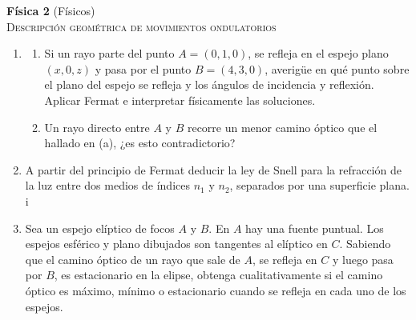\documentclass[11pt,spanish,a4paper]{article}
\begin{document}
\begin{center}
  \textbf{Física 2} (Físicos) \hfill {}\\
  \textsc{\LARGE Descripción geométrica de movimientos ondulatorios}
\par\end{center}{\large \par}



\begin{enumerate}

\section*{Fermat, Snell}


\item 
\begin{enumerate}
	\item Si un rayo parte del punto $A=(0,1,0)$, se refleja en el espejo plano
$(x,0,z)$ y pasa por el punto $B=(4,3,0)$, averigüe en qué punto
sobre el plano del espejo se refleja y los ángulos de incidencia y
reflexión. Aplicar Fermat e interpretar físicamente las soluciones. 
	\item Un rayo directo entre $A$ y $B$ recorre un menor camino óptico que
el hallado en (a), ¿es esto contradictorio?
\end{enumerate}


\item A partir del principio de Fermat deducir la ley de Snell para la refracción
de la luz entre dos medios de índices $n_{1}$ y $n_{2}$, separados
por una superficie plana.
i

\item Sea un espejo elíptico de focos $A$ y $B$. En $A$ hay una fuente
puntual. Los espejos esférico y plano dibujados son tangentes al elíptico
en $C$. Sabiendo que el camino óptico de un rayo que sale de $A$,
se refleja en $C$ y luego pasa por $B$, es estacionario en la elipse,
obtenga cualitativamente si el camino óptico es máximo, mínimo o estacionario
cuando se refleja en cada uno de los espejos.



\end{enumerate}
\end{document}
